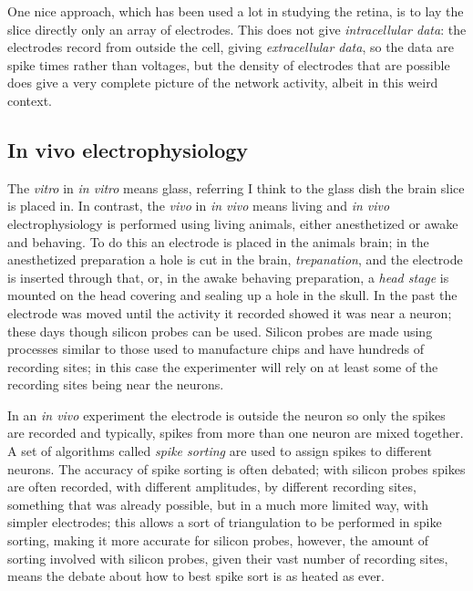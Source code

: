 \documentclass[12pt]{article}
\begin{document}
One nice approach, which has been used a lot in studying the retina,
is to lay the slice directly only an array of electrodes. This does
not give \textsl{intracellular data}: the electrodes record from
outside the cell, giving \textsl{extracellular data}, so the data are
spike times rather than voltages, but the density of electrodes that
are possible does give a very complete picture of the network
activity, albeit in this weird context.

\subsection*{In vivo electrophysiology}

The \textsl{vitro} in \textsl{in vitro} means glass, referring I think
to the glass dish the brain slice is placed in. In contrast, the
\textsl{vivo} in \textsl{in vivo} means living and \textsl{in vivo}
electrophysiology is performed using living animals, either
anesthetized or awake and behaving. To do this an electrode is placed
in the animals brain; in the anesthetized preparation a hole is cut in
the brain, \textsl{trepanation}, and the electrode is inserted through
that, or, in the awake behaving preparation, a \textsl{head stage} is
mounted on the head covering and sealing up a hole in the skull. In
the past the electrode was moved until the activity it recorded showed
it was near a neuron; these days though silicon probes can be
used. Silicon probes are made using processes similar to those used to
manufacture chips and have hundreds of recording sites; in this case
the experimenter will rely on at least some of the recording sites
being near the neurons.

In an \textsl{in vivo} experiment the electrode is outside the neuron
so only the spikes are recorded and typically, spikes from more than
one neuron are mixed together. A set of algorithms called
\textsl{spike sorting} are used to assign spikes to different
neurons. The accuracy of spike sorting is often debated; with silicon
probes spikes are often recorded, with different amplitudes, by
different recording sites, something that was already possible, but in
a much more limited way, with simpler electrodes; this allows a sort
of triangulation to be performed in spike sorting, making it more
accurate for silicon probes, however, the amount of sorting involved
with silicon probes, given their vast number of recording sites, means
the debate about how to best spike sort is as heated as ever.
\end{document}
